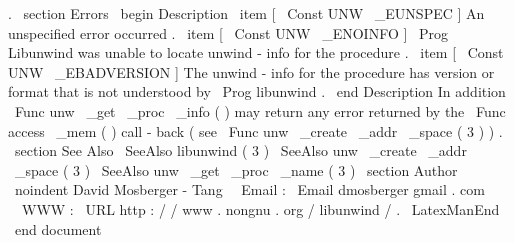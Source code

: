 .
\
section
{
Errors
}
\
begin
{
Description
}
\
item
[
\
Const
{
UNW
\
_EUNSPEC
}
]
An
unspecified
error
occurred
.
\
item
[
\
Const
{
UNW
\
_ENOINFO
}
]
\
Prog
{
Libunwind
}
was
unable
to
locate
unwind
-
info
for
the
procedure
.
\
item
[
\
Const
{
UNW
\
_EBADVERSION
}
]
The
unwind
-
info
for
the
procedure
has
version
or
format
that
is
not
understood
by
\
Prog
{
libunwind
}
.
\
end
{
Description
}
In
addition
\
Func
{
unw
\
_get
\
_proc
\
_info
}
(
)
may
return
any
error
returned
by
the
\
Func
{
access
\
_mem
}
(
)
call
-
back
(
see
\
Func
{
unw
\
_create
\
_addr
\
_space
}
(
3
)
)
.
\
section
{
See
Also
}
\
SeeAlso
{
libunwind
(
3
)
}
\
SeeAlso
{
unw
\
_create
\
_addr
\
_space
(
3
)
}
\
SeeAlso
{
unw
\
_get
\
_proc
\
_name
(
3
)
}
\
section
{
Author
}
\
noindent
David
Mosberger
-
Tang
\
\
Email
:
\
Email
{
dmosberger
gmail
.
com
}
\
\
WWW
:
\
URL
{
http
:
/
/
www
.
nongnu
.
org
/
libunwind
/
}
.
\
LatexManEnd
\
end
{
document
}
